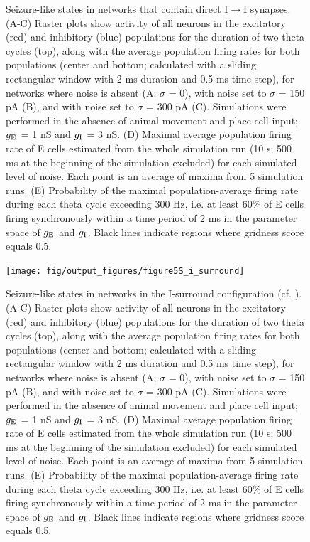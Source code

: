 \documentclass[a4paper,12pt]{article}
\newcommand{\ssc}[3]{\ensuremath{#1_{\text{#2}_{\text{#3}}}}}
\newcommand{\gE      }{\ssc{g}      {\scriptsize{E}}{}}
\newcommand{\gI      }{\ssc{g}      {\scriptsize{I}}{}}
\begin{document}
\begin{figure}[H]
    \internallinenumbers
    \caption{Seizure-like states in networks that contain direct
    I$\rightarrow$I synapses. (A-C) Raster plots show activity of all neurons
    in the excitatory (red) and inhibitory (blue) populations for the duration
    of two theta cycles (top), along with the average population firing rates
    for both populations (center and bottom; calculated with a sliding
    rectangular window with 2 ms duration and 0.5 ms time step), for networks
    where noise is absent (A; $\sigma$ = 0), with noise set to $\sigma$ = 150
    pA (B), and with noise set to $\sigma$ = 300 pA (C). Simulations were
    performed in the absence of animal movement and place cell input; $\gE$ = 1 nS
    and $\gI$ = 3 nS.  (D) Maximal average population firing rate of E cells
    estimated from the whole simulation run (10 s; 500 ms at the beginning of
    the simulation excluded) for each simulated level of noise. Each point is
    an average of maxima from 5 simulation runs.  (E) Probability of the
    maximal population-average firing rate during each theta cycle exceeding
    300 Hz, i.e. at least 60\% of E cells firing synchronously within a time
    period of 2 ms in the parameter space of $\gE$ and $\gI$. Black lines indicate
    regions where gridness score equals 0.5.}
\end{figure}

\clearpage

\begin{figure}[p]
    \internallinenumbers
    \centering
        \texttt{[image: fig/output\_figures/figure5S\_i\_surround]}
\end{figure}

\clearpage

\begin{figure}[H]
    \internallinenumbers
    \caption{Seizure-like states in networks in the I-surround configuration
    (cf. \cite{Pastoll:2013ff}). (A-C) Raster plots show activity of all
    neurons in the excitatory (red) and inhibitory (blue) populations for the
    duration of two theta cycles (top), along with the average population
    firing rates for both populations (center and bottom; calculated with a
    sliding rectangular window with 2 ms duration and 0.5 ms time step), for
    networks where noise is absent (A; $\sigma$ = 0), with noise set to
    $\sigma$ = 150 pA (B), and with noise set to $\sigma$ = 300 pA (C).
    Simulations were performed in the absence of animal movement and place cell
    input; $\gE$ = 1 nS and $\gI$ = 3 nS.  (D) Maximal average population firing rate
    of E cells estimated from the whole simulation run (10 s; 500 ms at the
    beginning of the simulation excluded) for each simulated level of noise.
    Each point is an average of maxima from 5 simulation runs.  (E) Probability
    of the maximal population-average firing rate during each theta cycle
    exceeding 300 Hz, i.e. at least 60\% of E cells firing synchronously within
    a time period of 2 ms in the parameter space of $\gE$ and $\gI$. Black lines
    indicate regions where gridness score equals 0.5.}
\end{figure}
\end{document}
